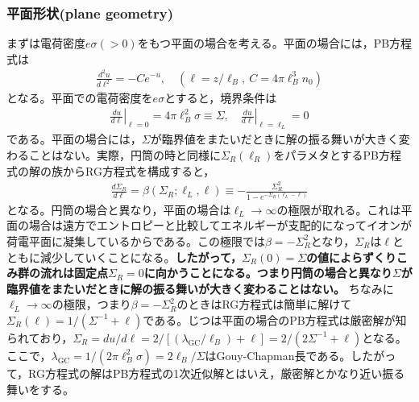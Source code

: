 \documentclass[11pt,a4paper]{ltjsarticle}
\theoremstyle{definition}
\theoremstyle{remark}
\begin{document}
\subsubsection{平面形状(plane geometry)}
まずは電荷密度$e\sigma(>0)$をもつ平面の場合を考える。平面の場合には，PB方程式は
\begin{align}
  \frac{d^2 u}{d\ell ^2} = - C e^{-u},\quad (\ell=z/\ell_B,\ C=4\pi\ell_B^3n_0) \label{eq:pb_plane}
\end{align}
となる。平面での電荷密度を$e\sigma$とすると，境界条件は
\begin{align}
  \left.\frac{du}{d\ell}\right|_{\ell=0} = 4\pi \ell_B^2 \sigma\equiv \Sigma, \quad \left.\frac{du}{d\ell}\right|_{\ell=\ell_L} = 0 \label{eq:boundary_plane}
\end{align}
である。平面の場合には，$\Sigma$が臨界値をまたいだときに解の振る舞いが大きく変わることはない。実際，円筒の時と同様に$\Sigma_R(\ell_R)$をパラメタとするPB方程式の解の族からRG方程式を構成すると，
\begin{align}
  \frac{d\Sigma_R}{d\ell} = \beta(\Sigma_R;\ell_L,\ell) \equiv -\frac{\Sigma_R^2}{1-e^{-\Sigma_R(\ell_L-\ell)}} \label{eq:beta_plane}
\end{align}
となる。円筒の場合と異なり，平面の場合は$\ell_L\to \infty$の極限が取れる。これは平面の場合は遠方でエントロピーと比較してエネルギーが支配的になってイオンが荷電平面に凝集しているからである。この極限では$\beta=-\Sigma_R^2$となり，$\Sigma_R$は$\ell$とともに減少していくことになる。\textbf{したがって，$\Sigma_R(0)=\Sigma$の値によらずくりこみ群の流れは固定点$\Sigma_R=0$に向かうことになる。つまり円筒の場合と異なり$\Sigma$が臨界値をまたいだときに解の振る舞いが大きく変わることはない。} ちなみに$\ell_L\to \infty$の極限，つまり$\beta=-\Sigma_R^2$のときはRG方程式は簡単に解けて$\Sigma_R(\ell)=1/(\Sigma^{-1}+ \ell)$である。じつは平面の場合のPB方程式は厳密解が知られており，$\Sigma_R=du/d\ell=2/[(\lambda_\mathrm{GC}/\ell_B)+\ell]=2/(2\Sigma^{-1}+\ell)$となる。ここで，$\lambda_\mathrm{GC}=1/(2\pi \ell_B^2 \sigma)=2\ell_B/\Sigma$はGouy-Chapman長である。したがって，RG方程式の解はPB方程式の1次近似解とはいえ，厳密解とかなり近い振る舞いをする。
\end{document}
